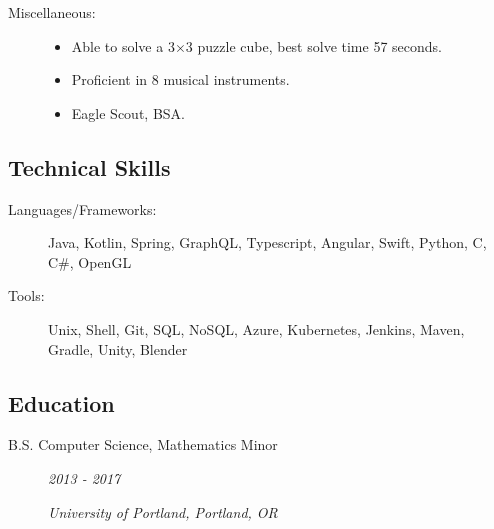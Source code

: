 \documentclass{article}
\def \intraspace {0.1em}
\begin{document}
\begin{description}
            \vspace{\intraspace}

        \item[Miscellaneous:] \hfill
            \begin{itemize}
                \item Able to solve a 3$\times$3 puzzle cube, best solve time 57 seconds.
                \item Proficient in 8 musical instruments.
                \item Eagle Scout, BSA.
        \end{itemize}
    \end{description}


\subsection*{Technical Skills}
    \begin{description}    
        \item[Languages/Frameworks:] 
            Java, 
            Kotlin,
            Spring,
            GraphQL,
            Typescript,
            Angular,
            Swift,
            Python,
            C,
            C\#,
            OpenGL

            \vspace{\intraspace}

        \item[Tools:] 
            Unix,
            Shell,
            Git,
            SQL,
            NoSQL,
            Azure,
            Kubernetes,
            Jenkins,
            Maven,
            Gradle,
            Unity,
            Blender
    \end{description}
    
\subsection*{Education}
    \begin{description}
        \item[B.S. Computer Science, Mathematics Minor]\hfill \textit{2013 - 2017}

        \textit{University of Portland, Portland, OR}
    \end{description}
\end{document}
